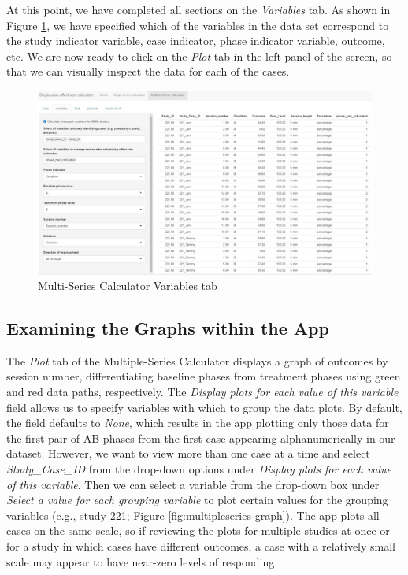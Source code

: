 \documentclass[
]{book}
\begin{document}
At this point, we have completed all sections on the \emph{Variables} tab. As shown in Figure \ref{fig:multipleseries-var-filled}, we have specified which of the variables in the data set correspond to the study indicator variable, case indicator, phase indicator variable, outcome, etc. We are now ready to click on the \emph{Plot} tab in the left panel of the screen, so that we can visually inspect the data for each of the cases.

\begin{figure}
\includegraphics[width=0.75\linewidth]{images/multiseries_variables_filled} \caption{Multi-Series Calculator Variables tab}\label{fig:multipleseries-var-filled}
\end{figure}

\hypertarget{examining-the-graphs-within-the-app}{%
\subsection{Examining the Graphs within the App}\label{examining-the-graphs-within-the-app}}

The \emph{Plot} tab of the Multiple-Series Calculator displays a graph of outcomes by session number, differentiating baseline phases from treatment phases using green and red data paths, respectively. The \emph{Display plots for each value of this variable} field allows us to specify variables with which to group the data plots. By default, the field defaults to \emph{None}, which results in the app plotting only those data for the first pair of AB phases from the first case appearing alphanumerically in our dataset. However, we want to view more than one case at a time and select \emph{Study\_Case\_ID} from the drop-down options under \emph{Display plots for each value of this variable}. Then we can select a variable from the drop-down box under \emph{Select a value for each grouping variable} to plot certain values for the grouping variables (e.g., study 221; Figure \ref{fig:multipleseries-graph}). The app plots all cases on the same scale, so if reviewing the plots for multiple studies at once or for a study in which cases have different outcomes, a case with a relatively small scale may appear to have near-zero levels of responding.
\end{document}
